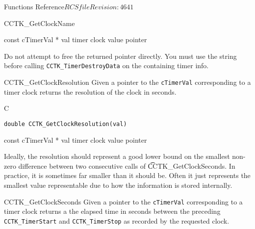 \begin{cactuspart}{ Functions Reference}{$RCSfile$}{$Revision: 4641 $}
\begin{FunctionDescription}{CCTK\_GetClockName}
\begin{ParameterSection}
\begin{Parameter}{const cTimerVal * val}
timer clock value pointer
\end{Parameter}
\end{ParameterSection}

\begin{Discussion}
Do not attempt to free the returned pointer directly.  You must use the
string before calling {\tt CCTK\_TimerDestroyData} on the containing
timer info.
\end{Discussion}
\end{FunctionDescription}

\begin{FunctionDescription}{CCTK\_GetClockResolution}
\label{CCTK-GetClockResolution}
Given a pointer to the
{\tt cTimerVal} corresponding to a timer clock returns the resolution of
the clock in seconds.

\begin{SynopsisSection}
\begin{Synopsis}{C}
\begin{verbatim}
double CCTK_GetClockResolution(val)
\end{verbatim}
\end{Synopsis}
\end{SynopsisSection}

\begin{ParameterSection}
\begin{Parameter}{const cTimerVal * val}
timer clock value pointer
\end{Parameter}
\end{ParameterSection}

\begin{Discussion}
Ideally, the resolution should represent a good lower bound on the smallest
non-zero difference between two consecutive calls of {\t CCTK\_GetClockSeconds}.
In practice, it is sometimes far smaller than it should be.  Often it just
represents the smallest value representable due to how the information is
stored internally.
\end{Discussion}
\end{FunctionDescription}



\begin{FunctionDescription}{CCTK\_GetClockSeconds}
\label{CCTK-GetClockSeconds}
Given a pointer to the {\tt cTimerVal}
corresponding to a timer clock returns a the elapsed time in seconds between
the preceding {\tt CCTK\_TimerStart} and {\tt CCTK\_TimerStop} as recorded
by the requested clock.


\end{FunctionDescription}
\end{cactuspart}
